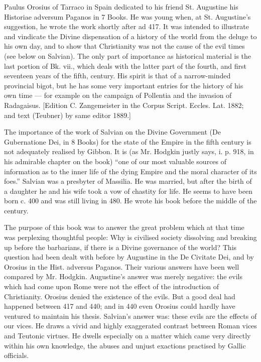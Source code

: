 Paulus Orosius of Tarraco in Spain dedicated to his friend St. Augustine his Historiae adversum Paganos in 7 Books. He was young when, at St. Augustine\texthebrew{}’s suggestion, he wrote the work shortly after ad 417. It was intended to illustrate and vindicate the Divine dispensation of a history of the world from the deluge to his own day, and to show that Christianity was not the cause of the evil times (see below on Salvian). The only part of importance as historical material is the last portion of Bk. vii., which deals with the latter part of the fourth, and first seventeen years of the fifth, century. His spirit is that of a narrow-minded provincial bigot, but he has some very important entries for the history of his own time \texthebrew{—} for example on the campaign of Pollentia and the invasion of Radagaisus. [Edition C. Zangemeister in the Corpus Script. Eccles. Lat. 1882; and text (Teubner) by same editor 1889.]

The importance of the work of Salvian on the Divine Government (De Gubernatione Dei, in 8 Books) for the state of the Empire in the fifth century is not adequately realised by Gibbon. It is (as Mr. Hodgkin justly says, i. p. 918, in his admirable chapter on the book) \texthebrew{“}one of our most valuable sources of information as to the inner life of the dying Empire and the moral character of its foes.\texthebrew{}” Salvian was a presbyter of Massilia. He was married, but after the birth of a daughter he and his wife took a vow of chastity for life. He seems to have been born c. 400 and was still living in 480. He wrote his book before the middle of the century.

The purpose of this book was to answer the great problem which at that time was perplexing thoughtful people: Why is civilised society dissolving and breaking up before the barbarians, if there is a Divine governance of the world? This question had been dealt with before by Augustine in the De Civitate Dei, and by Orosius in the Hist. adversus Paganos. Their various answers have been well compared by Mr. Hodgkin. Augustine\texthebrew{}’s answer was merely negative: the evils which had come upon Rome were not the effect of the introduction of Christianity. Orosius denied the existence of the evils. But a good deal had happened between 417 and 440; and in 440 even Orosius could hardly have ventured to maintain his thesis. Salvian\texthebrew{}’s answer was: these evils are the effects of our vices. He draws a vivid and highly exaggerated contrast between Roman vices and Teutonic virtues. He dwells especially on a matter which came very directly within his own knowledge, the abuses and unjust exactions practised by Gallic officials.


